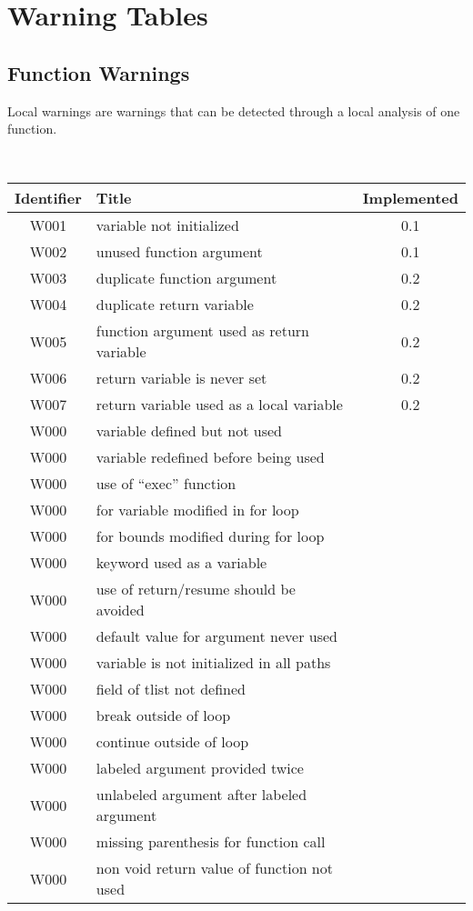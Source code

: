 \section{Warning Tables}

\subsection{Function Warnings}



Local warnings are warnings that can be detected through a local analysis of
one function.



\noindent\\\begin{tabular}{|c|p{8cm}|c|} \hline
Identifier & Title & Implemented      \\ \hline
W001 & variable not initialized & 0.1 \\ \hline
W002 & unused function argument & 0.1 \\ \hline
W003 & duplicate function argument & 0.2 \\ \hline
W004 & duplicate return variable   & 0.2 \\ \hline
W005 & function argument used as return variable   & 0.2 \\ \hline
W006 & return variable is never set & 0.2 \\ \hline
W007 & return variable used as a local variable & 0.2 \\ \hline
W000 & variable defined but not used &  \\ \hline
W000 & variable redefined before being used &  \\ \hline
W000 & use of ``exec'' function      &  \\ \hline
W000 & for variable modified in for loop &  \\ \hline
W000 & for bounds modified during for loop &  \\ \hline
W000 & keyword used as a variable &  \\ \hline
W000 & use of return/resume should be avoided &  \\ \hline
W000 & default value for argument never used &  \\ \hline
W000 & variable is not initialized in all paths &  \\ \hline
W000 & field of tlist not defined &  \\ \hline
W000 & break outside of loop &  \\ \hline
W000 & continue outside of loop &  \\ \hline
W000 & labeled argument provided twice &  \\ \hline
W000 & unlabeled argument after labeled argument &  \\ \hline
W000 & missing parenthesis for function call &  \\ \hline
W000 & non void return value of function not used &  \\ \hline
\end{tabular}

